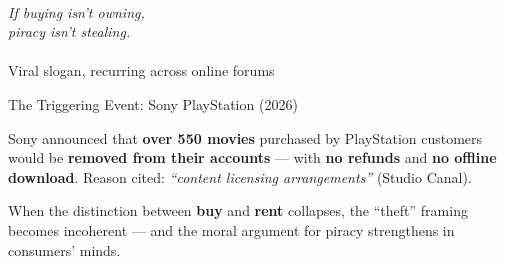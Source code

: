 \documentclass[aspectratio=169,11pt]{beamer}
\begin{document}
	\begin{frame}{}
		\centering
		\vfill
		{\Huge\color{ctpOverlay0}\faQuoteLeft}\\[0.35cm]
		{\LARGE\itshape\color{ctpPink} If buying isn't owning,\\[0.15cm] piracy isn't stealing.}\\[0.35cm]
		{\Huge\color{ctpOverlay0}\faQuoteRight}\\[0.7cm]
		\textcolor{ctpSubtext}{\small Viral slogan, recurring across online forums}
		\vfill
	\end{frame}
	
	\begin{frame}{The Triggering Event: Sony PlayStation (2026)}
		\begin{dangerbox}
			Sony announced that \textbf{over 550 movies} purchased by PlayStation customers would be \textbf{removed from their accounts} --- with \textbf{no refunds} and \textbf{no offline download}. Reason cited: \emph{``content licensing arrangements''} (Studio Canal).
		\end{dangerbox}
		\vspace{0.3cm}
		\centering
		\vspace{0.35cm}
		\begin{quotebox}
			\small When the distinction between \textbf{buy} and \textbf{rent} collapses, the ``theft'' framing becomes incoherent --- and the moral argument for piracy strengthens in consumers' minds.
		\end{quotebox}
	\end{frame}
	
\end{document}
